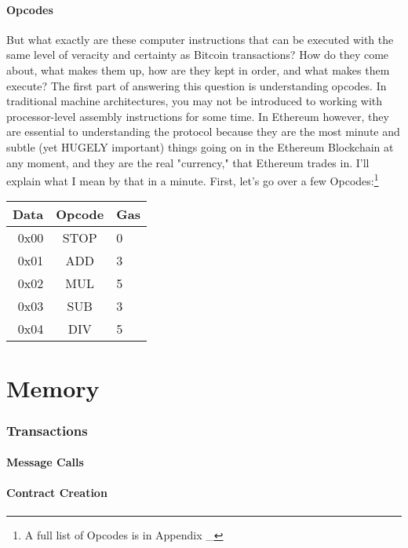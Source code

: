 \documentclass[11pt,a4paper,leqno,bibliography=totoc]{scrartcl}
\newenvironment{alphafootnotes}
{\par\edef\savedfootnotenumber{\number\value{footnote}}
\renewcommand{\thefootnote}{\alph{footnote}}
\setcounter{footnote}{0}}
{\par\setcounter{footnote}{\savedfootnotenumber}}
\begin{document}
\begin{alphafootnotes}
\begin{multicols*}{2}
	\subsection{Opcodes}
	But what exactly are these computer instructions that can be executed with the same level of veracity and certainty as Bitcoin transactions? How do they come about, what makes them up, how are they kept in order, and what makes them execute? The first part of answering this question is understanding opcodes. In traditional machine architectures, you may not be introduced to working with processor-level assembly instructions for some time. In Ethereum however, they are essential to understanding the protocol because they are the most minute and subtle (yet HUGELY important) things going on in the Ethereum Blockchain at any moment, and they are the real "currency," that Ethereum trades in. I'll explain what I mean by that in a minute. First, let's go over a few Opcodes:\footnote{A full list of Opcodes is in Appendix \_} \\

\centering

\begin{tabular}{|rcl|}
	\hline
	\textbf{Data} & \textbf{Opcode} & \textbf{Gas} \\
	\hline
	0x00 & STOP & 0 \\
	0x01 & ADD & 3 \\
	0x02 & MUL & 5 \\
	0x03 & SUB & 3 \\
	0x04 & DIV & 5 \\
	\hline
\end{tabular}

\justify

	\part{Memory}

\section{Transactions}

\subsection{Message Calls}

\subsection{Contract Creation}


\end{multicols*}
\end{alphafootnotes}
\end{document}
